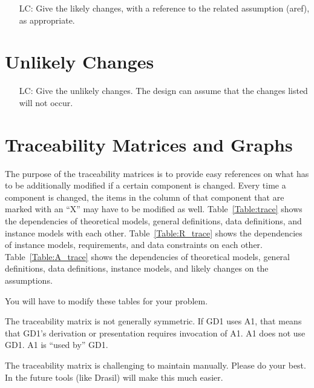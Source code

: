 \documentclass[12pt]{article}
\newcounter{lcnum} %
\begin{document}
\noindent \begin{itemize}

\item[LC\refstepcounter{lcnum}\thelcnum\label{LC_meaningfulLabel}:] Give the
    likely changes, with a reference to the related assumption (aref), as
    appropriate.

\end{itemize}

\section{Unlikely Changes}    

\noindent \begin{itemize}

\item[LC\refstepcounter{lcnum}\thelcnum\label{LC_meaningfulLabel}:] Give the
    unlikely changes.  The design can assume that the changes listed will not
    occur.

\end{itemize}

\section{Traceability Matrices and Graphs}

The purpose of the traceability matrices is to provide easy references on what
has to be additionally modified if a certain component is changed.  Every time a
component is changed, the items in the column of that component that are marked
with an ``X'' may have to be modified as well.  Table~\ref{Table:trace} shows
the dependencies of theoretical models, general definitions, data definitions,
and instance models with each other. Table~\ref{Table:R_trace} shows the
dependencies of instance models, requirements, and data constraints on each
other. Table~\ref{Table:A_trace} shows the dependencies of theoretical models,
general definitions, data definitions, instance models, and likely changes on
the assumptions.

You will have to modify these tables for your problem.

The traceability matrix is not generally symmetric.  If GD1 uses A1, that means
that GD1's derivation or presentation requires invocation of A1.  A1 does not
use GD1.  A1 is ``used by'' GD1.

The traceability matrix is challenging to maintain manually.  Please do your
best.  In the future tools (like Drasil) will make this much easier.
\end{document}
